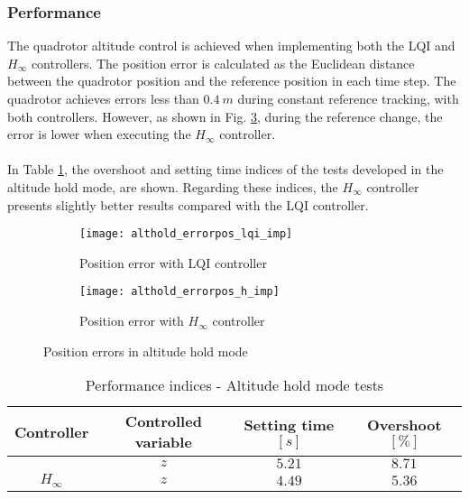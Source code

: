 \subsubsection{Performance}
The quadrotor altitude control is achieved when implementing both the LQI and $H_\infty$ controllers.
The position error is calculated as the Euclidean distance between the quadrotor position and the reference position in each time step. The quadrotor achieves errors less than $0.4\ m$ during constant reference tracking, with both controllers. However, as shown in Fig. \ref{fig:althold_errorpos_imp}, during the reference change, the error is lower when executing the $H_\infty$ controller.
\\\\
In Table \ref{tb:althold_index}, the overshoot and setting time indices of the tests developed in the altitude hold mode, are shown. Regarding these indices, the $H_\infty$ controller presents slightly better results compared with the LQI controller.
\begin{figure}[hh]
\begin{subfigure}{.5\linewidth}
\centering
\texttt{[image: althold\_errorpos\_lqi\_imp]}
\caption{Position error with LQI controller}
\label{fig:althold_errorpos_lqi_imp}
\end{subfigure}%
\begin{subfigure}{.5\linewidth}
\centering
\texttt{[image: althold\_errorpos\_h\_imp]}
\caption{Position error with $H_\infty$ controller}
\label{fig:althold_errorpos_h_imp}
\end{subfigure}
\caption{Position errors in altitude hold mode}
\label{fig:althold_errorpos_imp}
\end{figure}
\begin{table}[h]
\small
\begin{center}
\caption{Performance indices - Altitude hold mode tests}\label{tb:althold_index}
\begin{tabular}{c|c|c|c}\hline
\rule{0pt}{3ex} Controller & Controlled variable & Setting time $[s]$ & Overshoot $[\%]$ \\\hline\hline
\rule{0pt}{3ex} 
\multirow{1}{*}{LQI} 
 & $z$ & $5.21$ & $8.71$ \\ \hline
\multirow{1}{*}{$H_\infty$} 
 & $z$ & $4.49$ & $5.36$ \\ \hline\hline
\end{tabular}
\end{center}
\end{table}
\\\\
